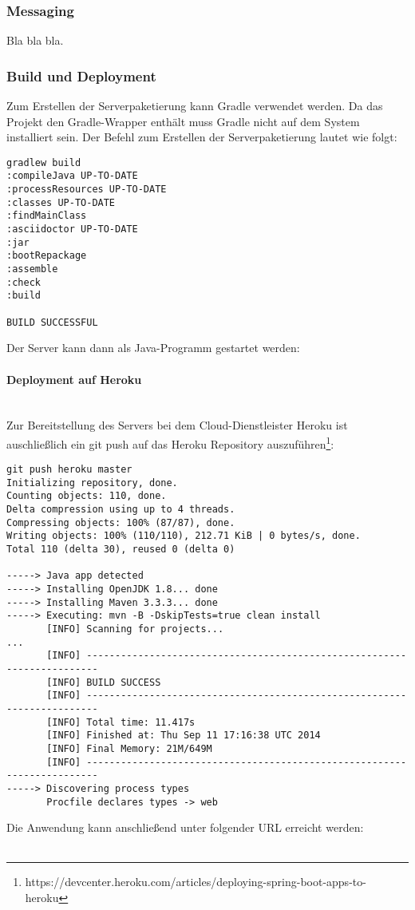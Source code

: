 \subsubsection{Messaging}\label{Messaging}
Bla bla bla.

\subsubsection{Build und Deployment}\label{Backend_Deployment}
Zum Erstellen der Serverpaketierung kann Gradle verwendet werden. Da das Projekt den Gradle-Wrapper enthält muss Gradle nicht auf dem System installiert sein. Der Befehl zum Erstellen der Serverpaketierung lautet wie folgt:\\
\vspace{2em}
\begin{lstlisting}
gradlew build
:compileJava UP-TO-DATE
:processResources UP-TO-DATE
:classes UP-TO-DATE
:findMainClass
:asciidoctor UP-TO-DATE
:jar
:bootRepackage
:assemble
:check
:build

BUILD SUCCESSFUL

\end{lstlisting}
\vspace{2em}
Der Server kann dann als Java-Programm gestartet werden:\\
\paragraph{Deployment auf Heroku}\mbox{}\\
Zur Bereitstellung des Servers bei dem Cloud-Dienstleister Heroku ist auschließlich ein git push auf das Heroku Repository auszuführen\footnote{https://devcenter.heroku.com/articles/deploying-spring-boot-apps-to-heroku}:
\vspace{2em}
\begin{lstlisting}
git push heroku master
Initializing repository, done.
Counting objects: 110, done.
Delta compression using up to 4 threads.
Compressing objects: 100% (87/87), done.
Writing objects: 100% (110/110), 212.71 KiB | 0 bytes/s, done.
Total 110 (delta 30), reused 0 (delta 0)

-----> Java app detected
-----> Installing OpenJDK 1.8... done
-----> Installing Maven 3.3.3... done
-----> Executing: mvn -B -DskipTests=true clean install
       [INFO] Scanning for projects...
...
       [INFO] ------------------------------------------------------------------------
       [INFO] BUILD SUCCESS
       [INFO] ------------------------------------------------------------------------
       [INFO] Total time: 11.417s
       [INFO] Finished at: Thu Sep 11 17:16:38 UTC 2014
       [INFO] Final Memory: 21M/649M
       [INFO] ------------------------------------------------------------------------
-----> Discovering process types
       Procfile declares types -> web

\end{lstlisting}
\vspace{2em}
Die Anwendung kann anschließend unter folgender URL erreicht werden:\\
\\